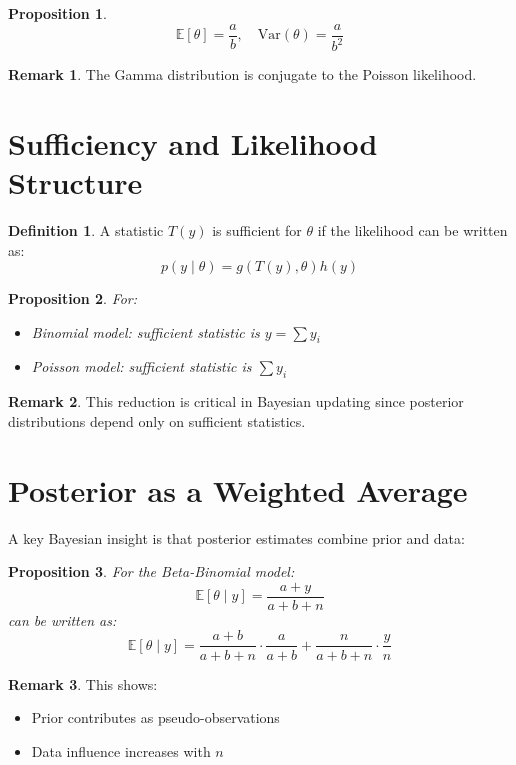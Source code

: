 \documentclass[12pt,oneside]{book}
\numberwithin{equation}{section}
\theoremstyle{definition}
\newtheorem{definition}{Definition}[section]
\newtheorem{remark}{Remark}[section]
\theoremstyle{plain}
\newtheorem{proposition}{Proposition}[section]
\theoremstyle{remark}
\newcommand{\E}{\mathbb{E}}
\newcommand{\Var}{\mathrm{Var}}
\begin{document}
\begin{proposition}
$$
\E[\theta] = \frac{a}{b}, \quad \Var(\theta) = \frac{a}{b^2}
$$
\end{proposition}

\begin{remark}
The Gamma distribution is conjugate to the Poisson likelihood.
\end{remark}

\section{Sufficiency and Likelihood Structure}

\begin{definition}
A statistic $T(y)$ is sufficient for $\theta$ if the likelihood can be written as:
$$
p(y \mid \theta) = g(T(y), \theta) h(y)
$$
\end{definition}

\begin{proposition}
For:
\begin{itemize}
    \item Binomial model: sufficient statistic is $y = \sum y_i$
    \item Poisson model: sufficient statistic is $\sum y_i$
\end{itemize}
\end{proposition}

\begin{remark}
This reduction is critical in Bayesian updating since posterior distributions depend only on sufficient statistics.
\end{remark}

\section{Posterior as a Weighted Average}

A key Bayesian insight is that posterior estimates combine prior and data:

\begin{proposition}
For the Beta-Binomial model:
$$
\E[\theta \mid y] = \frac{a+y}{a+b+n}
$$
can be written as:
$$
\E[\theta \mid y] =
\frac{a+b}{a+b+n} \cdot \frac{a}{a+b}
+
\frac{n}{a+b+n} \cdot \frac{y}{n}
$$
\end{proposition}

\begin{remark}
This shows:
\begin{itemize}
    \item Prior contributes as pseudo-observations
    \item Data influence increases with $n$
\end{itemize}
\end{remark}
\end{document}
